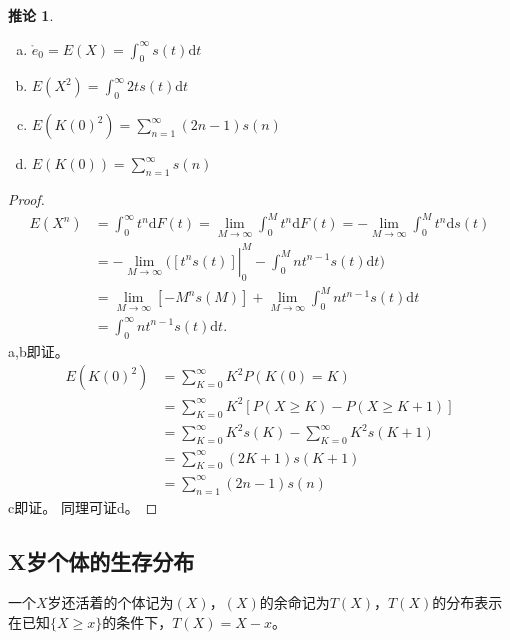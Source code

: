 \documentclass[12pt, a4paper, oneside]{ctexbook}
\newtheorem{corollary}[theorem]{推论}
\begin{document}
\begin{corollary}
    \begin{enumerate}[a.]
        \item $\mathring{e}_0 = E(X) = \int_0^{\infty}s(t)\mathrm{d}t$
        \item $E(X^2) = \int_{0}^{\infty} 2ts(t)\mathrm{d}t$
        \item $E(K(0)^2) = \sum_{n = 1}^{\infty} (2n-1)s(n)$
        \item $E(K(0)) = \sum_{n = 1}^{\infty} s(n)$
    \end{enumerate}
\end{corollary}
\begin{proof}
    \begin{equation*}
        \begin{aligned}
            {E}\left(X^{n}\right) & =\int_0^\infty t^n\mathrm{d}F(t)=\lim_{M\to\infty}\int_0^Mt^n\mathrm{d}F(t)=-\lim_{M\to\infty}\int_0^Mt^n\mathrm{d}s(t) \\
                                  & \left.=-\lim_{M\to\infty}(\left[t^ns(t)\right]\right|_0^M-\int_0^Mnt^{n-1}s(t)\mathrm{d}t)                              \\
                                  & =\lim_{M\to\infty}[-M^ns(M)]+\lim_{M\to\infty}\int_0^Mnt^{n-1}s(t)\mathrm{d}t                                           \\
                                  & =\int_0^\infty nt^{n-1}s(t)\mathrm{d}t.
        \end{aligned}
    \end{equation*}
    a,b即证。
    \begin{equation*}
        \begin{aligned}
            E(K(0)^2) & = \sum_{K = 0}^{\infty} K^2P(K(0) = K)                            \\
                      & = \sum_{K = 0}^{\infty} K^2[P(X \geq K) - P(X \geq K+1)]          \\
                      & = \sum_{K = 0}^{\infty} K^2s(K) - \sum_{K = 0}^{\infty} K^2s(K+1) \\
                      & = \sum_{K = 0}^{\infty} (2K+1)s(K+1)                              \\
                      & = \sum_{n = 1}^{\infty} (2n-1)s(n)
        \end{aligned}
    \end{equation*}
    c即证。
    同理可证d。
\end{proof}

\subsection{X岁个体的生存分布}
一个$X$岁还活着的个体记为$(X)$，$(X)$的余命记为$T(X)$，$T(X)$的分布表示在已知$\{X\geq x\}$的条件下，$T(X) = X - x$。
\end{document}

